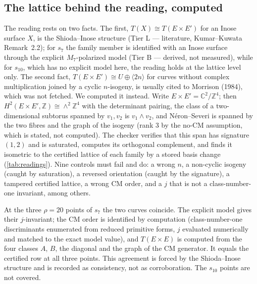 \documentclass[11pt,a4paper]{article}
\theoremstyle{remark}
\newcommand{\tierB}{\colorbox{yellow!20}{\textsf{\scriptsize Tier B --- derived, not measured}}}
\newcommand{\tierL}{\colorbox{blue!10}{\textsf{\scriptsize Tier L --- literature}}}
\begin{document}
\subsection{The lattice behind the reading, computed}\label{sec:readings}

The reading rests on two facts. The first, $T(X)\cong T(E\times E')$ for an Inose surface $X$, is the
Shioda--Inose structure (\tierL, Kumar--Kuwata Remark~2.2); for $s_7$ the family member is identified with an
Inose surface through the explicit $M_7$-polarized model (\tierB), while for $s_{10}$, which has no explicit
model here, the reading holds at the lattice level only. The second fact, $T(E\times E')\cong U\oplus\langle
2n\rangle$ for curves without complex multiplication joined by a cyclic $n$-isogeny, is usually cited to
Morrison (1984), which was not fetched. We computed it instead. Write $E\times E'=\mathbb{C}^2/\mathbb{Z}^4$;
then $H^2(E\times E',\mathbb{Z})\cong\wedge^2\mathbb{Z}^4$ with the determinant pairing, the class of a
two-dimensional subtorus spanned by $v_1,v_2$ is $v_1\wedge v_2$, and N\'eron--Severi is spanned by the two
fibres and the graph of the isogeny (rank $3$ by the no-CM assumption, which is stated, not computed). The
checker verifies that this span has signature $(1,2)$ and is saturated, computes its orthogonal complement,
and finds it isometric to the certified lattice of each family by a stored basis change (\cref{tab:readings}).
Nine controls must fail and do: a wrong $n$, a non-cyclic isogeny (caught by saturation), a reversed
orientation (caught by the signature), a tampered certified lattice, a wrong CM order, and a $j$ that is not
a class-number-one invariant, among others.

At the three $\rho=20$ points of $s_7$ the two curves coincide. The explicit model gives their $j$-invariant;
the CM order is identified by computation (class-number-one discriminants enumerated from reduced primitive
forms, $j$ evaluated numerically and matched to the exact model value), and $T(E\times E)$ is computed from the
four classes $A$, $B$, the diagonal and the graph of the CM generator. It equals the certified row at all
three points. This agreement is forced by the Shioda--Inose structure and is recorded as consistency, not as
corroboration. The $s_{10}$ points are not covered.

\begin{table}[h]
\centering\small

\caption{Top: $T(E\times E')$ for a cyclic $n$-isogeny, computed in $\wedge^2\mathbb{Z}^4$, against each
family's certified $T$. Bottom: $T(E\times E)$ at the $s_7$ points of Picard number $20$ (forced
consistency).}\label{tab:readings}
\end{table}
\end{document}
